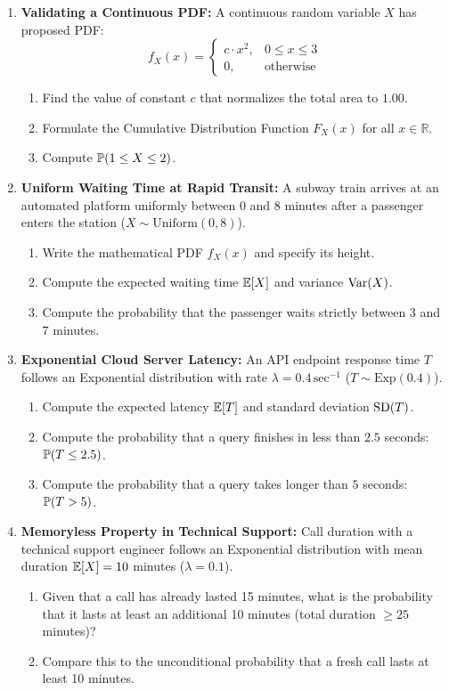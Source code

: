 \begin{enumerate}
    \item \textbf{Validating a Continuous PDF:} A continuous random variable $X$ has proposed PDF:
    $$f_X(x) = \begin{cases}
    c \cdot x^2, & 0 \le x \le 3 \\
    0, & \text{otherwise}
    \end{cases}$$
    \begin{enumerate}
        \item Find the value of constant $c$ that normalizes the total area to $1.00$.
        \item Formulate the Cumulative Distribution Function $F_X(x)$ for all $x \in \mathbb{R}$.
        \item Compute $\P(1 \le X \le 2)$.
    \end{enumerate}

    \item \textbf{Uniform Waiting Time at Rapid Transit:} A subway train arrives at an automated platform uniformly between $0$ and $8$ minutes after a passenger enters the station ($X \sim \text{Uniform}(0, 8)$).
    \begin{enumerate}
        \item Write the mathematical PDF $f_X(x)$ and specify its height.
        \item Compute the expected waiting time $\E[X]$ and variance $\Var(X)$.
        \item Compute the probability that the passenger waits strictly between $3$ and $7$ minutes.
    \end{enumerate}

    \item \textbf{Exponential Cloud Server Latency:} An API endpoint response time $T$ follows an Exponential distribution with rate $\lambda = 0.4\,\text{sec}^{-1}$ ($T \sim \text{Exp}(0.4)$).
    \begin{enumerate}
        \item Compute the expected latency $\E[T]$ and standard deviation $\SD(T)$.
        \item Compute the probability that a query finishes in less than $2.5$ seconds: $\P(T \le 2.5)$.
        \item Compute the probability that a query takes longer than $5$ seconds: $\P(T > 5)$.
    \end{enumerate}

    \item \textbf{Memoryless Property in Technical Support:} Call duration with a technical support engineer follows an Exponential distribution with mean duration $\E[X] = 10$ minutes ($\lambda = 0.1$).
    \begin{enumerate}
        \item Given that a call has already lasted 15 minutes, what is the probability that it lasts at least an additional 10 minutes (total duration $\ge 25$ minutes)?
        \item Compare this to the unconditional probability that a fresh call lasts at least 10 minutes.
    \end{enumerate}


\end{enumerate}
